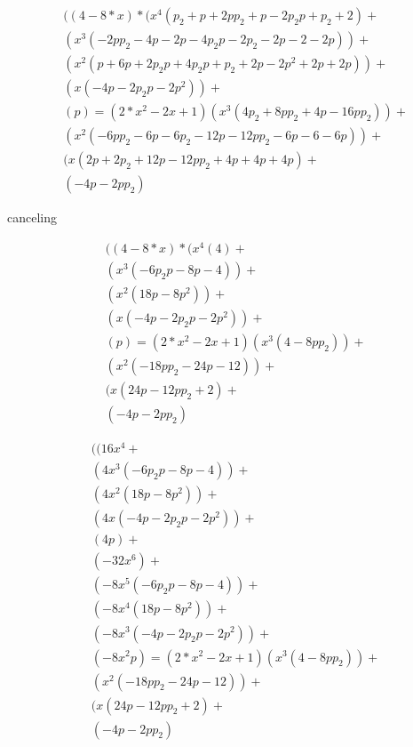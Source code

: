 \begin{align*}
&((4 - 8*x) * (x^4 ( p_2 + p+ 2 p p_2 + p - 2 p_2 p + p_2 + 2) + \\
&(x^3 ( -2 p p_2 - 4 p - 2p -4p_2 p  - 2 p_2 - 2 p - 2 - 2p) ) + \\
&(x^2 (p  + 6 p + 2p_2 p + 4 p_2 p + p_2 + 2p - 2p^2 + 2 p + 2p)) + \\
&(x (-4p -2 p_2 p - 2 p^2)) + \\
&(p)
 = (2*x^2 - 2x +1) (x^3 (4 p_2 + 8 p p_2 + 4 p - 16 p p_2)) + \\
&(x^2(-6 p p_2 - 6 p - 6 p_2 - 12p - 12 p p_2 - 6 p - 6 - 6p)) + \\
&(x(2p + 2p_2 + 12p - 12 p p_2 + 4p + 4p + 4p) + \\
&(-4p -2 p p_2)
\end{align*} 

canceling

\begin{align*}
&((4 - 8*x) * (x^4 (4) + \\
&(x^3 (-6 p_2 p - 8p - 4) ) + \\
&(x^2 (18p - 8p^2)) + \\
&(x (-4p -2 p_2 p - 2 p^2)) + \\
&(p)
 = (2*x^2 - 2x +1) (x^3 (4 - 8 p p_2 )) + \\
&(x^2(-18p p_2 - 24p - 12)) + \\
&(x(24 p - 12 p p_2 + 2) + \\
&(-4p -2 p p_2)
\end{align*} 

\begin{align*}
&((16 x^4  + \\
&(4 x^3 (-6 p_2 p - 8p - 4) ) + \\
&(4 x^2 (18p - 8p^2)) + \\
&(4 x (-4p -2 p_2 p - 2 p^2)) + \\
&(4p) + \\
&(-32 x^6)  + \\
&(-8x^5 (-6 p_2 p - 8p - 4) ) + \\
&(-8x^4 (18p - 8p^2)) + \\
&(-8x^3 (-4p -2 p_2 p - 2 p^2)) + \\
&(-8x^2p)
 = (2*x^2 - 2x +1) (x^3 (4 - 8 p p_2 )) + \\
&(x^2(-18p p_2 - 24p - 12)) + \\
&(x(24 p - 12 p p_2 + 2) + \\
&(-4p -2 p p_2)
\end{align*} 


